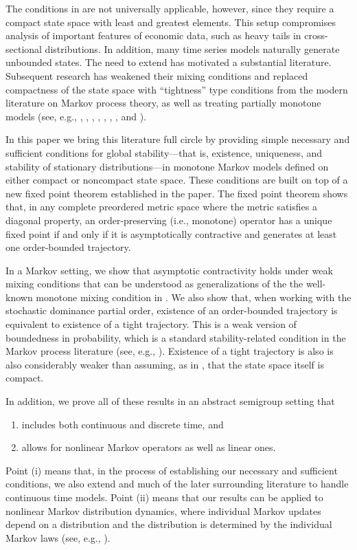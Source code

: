 \documentclass[12pt,reqno]{amsart}
\numberwithin{equation}{section}
\theoremstyle{definition}
\newcommand{\1}{\mathbbm{1}}
\begin{document}
The conditions in \cite{hopenhayn1992stochastic} are not universally applicable,
however, since they require a compact state space with least and greatest
elements.  This setup compromises analysis of important features of
economic data, such as heavy tails in cross-sectional distributions.
In addition, many time series models naturally generate unbounded states.
The need to extend \cite{hopenhayn1992stochastic} has motivated
a substantial literature. Subsequent
research has weakened their mixing conditions and replaced compactness of the state
space with ``tightness'' type conditions from the modern literature on Markov
process theory, as well as treating partially monotone models (see, e.g.,
\cite{ks12}, \cite{kamihigashi2014stochastic}, \cite{kamihigashi2016seeking},
\cite{foss2018stochastic}, \cite{kamihigashi2019unified},
\cite{foss2024compressibility}, \cite{light2024monotone}, and \cite{light2026invariant}).

In this paper we bring this literature full circle by providing simple necessary
and sufficient conditions for global stability---that is, existence, uniqueness,
and stability of stationary distributions---in monotone Markov models defined on
either compact or noncompact state space.  These
conditions are built on top of a new fixed point theorem established in the
paper. The fixed point theorem shows that, in any complete preordered metric
space where the metric satisfies a diagonal property, an order-preserving (i.e.,
monotone) operator has a unique fixed point if and only if it is asymptotically
contractive and generates at least one order-bounded trajectory.

In a Markov setting, we show that asymptotic contractivity holds under weak
mixing conditions that can be understood as generalizations of the the
well-known monotone mixing condition in \cite{hopenhayn1992stochastic}. We also
show that, when working with the stochastic dominance partial order, existence
of an order-bounded trajectory is equivalent to existence of a tight
trajectory.  This is a weak version of boundedness in probability, which is a
standard stability-related condition in the Markov process literature (see,
e.g., \cite{meyn2009markov, hahn2024central, ma2025optimal}).  Existence of a tight trajectory is also is also
considerably weaker than assuming, as in \cite{hopenhayn1992stochastic}, that
the state space itself is compact.

In addition, we prove all of these results in an abstract semigroup setting that
%
\begin{enumerate}
    \item includes both continuous and discrete time, and
    \item allows for nonlinear Markov operators as well as linear ones.
\end{enumerate}
%
Point (i) means that, in the process of establishing our necessary and
sufficient conditions, we also extend \cite{hopenhayn1992stochastic} and much of
the later surrounding literature to handle continuous time models. Point (ii)
means that our results can be applied to nonlinear Markov distribution dynamics,
where individual Markov updates depend on a distribution and the distribution is
determined by the individual Markov laws (see, e.g., \cite{light2026invariant}).
\end{document}
